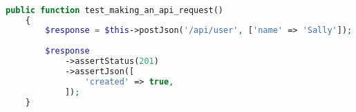 \begin{lstlisting}[language=PHP, caption= Script de Teste exemplificando asserções baseadas em campos de documentos \emph{JSON},label={code:JSONExampleTest}]

public function test_making_an_api_request()
    {
        $response = $this->postJson('/api/user', ['name' => 'Sally']);
 
        $response
            ->assertStatus(201)
            ->assertJson([
                'created' => true,
            ]);
    }
    
\end{lstlisting}

